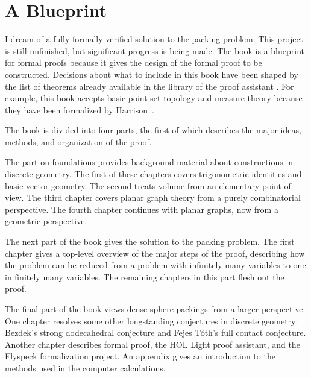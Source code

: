 \section*{A Blueprint}

I dream of a fully formally verified solution to the packing problem.
This project is still unfinished, but significant progress is being
made.  The book is a blueprint for formal proofs because it gives the
design of the formal proof to be constructed.  Decisions about what to
include in this book have been shaped by the list of theorems already
available in the library of the proof assistant .
For example, this book accepts basic point-set topology and measure
theory because they have been formalized by Harrison~\cite{HOLL}.


The book is divided into four parts, the first of which
 describes the major ideas, methods, and
organization of the proof.  


The part on foundations provides background material about
constructions in discrete geometry.  The first of these chapters
covers trigonometric identities and basic vector geometry.  The second
treats volume from an elementary point of view.  The third chapter
covers planar graph theory from a purely combinatorial perspective.
The fourth chapter continues with planar graphs, now from a geometric
perspective.

The next part of the book gives the solution to the packing problem.
The first chapter  gives a top-level overview of the major
steps of the proof,   describing how the problem can be reduced from
a problem with infinitely many variables to one in finitely many
variables.  The remaining chapters in this part flesh out the proof.

The final part of the book views dense sphere packings from a larger perspective.
One chapter resolves some other longstanding conjectures in
discrete geometry: Bezdek's strong dodecahedral conjecture and Fejes
T\'oth's full contact conjecture.  Another chapter describes  formal proof, 
the HOL Light proof assistant, and the Flyspeck formalization project.
An appendix  gives an introduction  to the methods used in the computer calculations.

